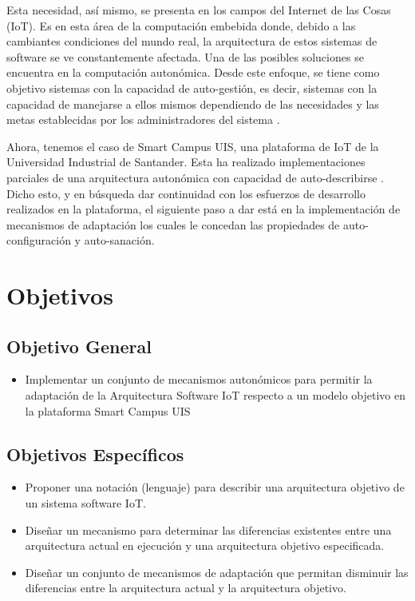 \documentclass[12pt]{article}
\begin{document}
    Esta necesidad, así mismo, se presenta en los campos del Internet de las Cosas (IoT). Es en esta área de la computación embebida donde, debido a las cambiantes condiciones del mundo real, la arquitectura de estos sistemas de software se ve constantemente afectada. Una de las posibles soluciones se encuentra en la computación autonómica. Desde este enfoque, se tiene como objetivo sistemas con la capacidad de auto-gestión, es decir, sistemas con la capacidad de manejarse a ellos mismos dependiendo de las necesidades y las metas establecidas por los administradores del sistema \cite{evaluation_2004}.
    
    Ahora, tenemos el caso de Smart Campus UIS, una plataforma de IoT de la Universidad Industrial de Santander. Esta ha realizado implementaciones parciales de una arquitectura autonómica con capacidad de auto-describirse \cite{henry_2020}. Dicho esto, y en búsqueda dar continuidad con los esfuerzos de desarrollo realizados en la plataforma, el siguiente paso a dar está en la implementación de mecanismos de adaptación los cuales le concedan las propiedades de auto-configuración y auto-sanación.

    \section{Objetivos}
    \subsection{Objetivo General}
    \begin{itemize}

        \item Implementar un conjunto de mecanismos autonómicos para permitir la adaptación de la Arquitectura Software IoT respecto a un modelo objetivo en la plataforma Smart Campus UIS

    \end{itemize}

    \subsection{Objetivos Específicos}

    \begin{itemize}
        \item Proponer una notación (lenguaje) para describir una arquitectura objetivo de un sistema software IoT.
        \item Diseñar un mecanismo para determinar las diferencias existentes entre una arquitectura actual en ejecución y una arquitectura objetivo especificada.
        \item Diseñar un conjunto de mecanismos de adaptación que permitan disminuir las diferencias entre la arquitectura actual y la arquitectura objetivo.

    \end{itemize}
\end{document}
